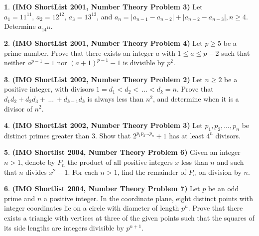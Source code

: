 \documentclass{article}
\newcommand{\plus}{+}
\newcommand{\minus}{-}
\newcommand{\equal}{=}
\theoremstyle{definition}
\newtheorem{p}{}
\begin{document}
\begin{p}{\bf (IMO ShortList 2001, Number Theory Problem 3)}
Let $ a_1 \equal{} 11^{11}, \, a_2 \equal{} 12^{12}, \, a_3 \equal{} 13^{13}$, and $ a_n \equal{} |a_{n \minus{} 1} \minus{} a_{n \minus{} 2}| \plus{} |a_{n \minus{} 2} \minus{} a_{n \minus{} 3}|, n \geq 4.$ Determine $ a_{14^{14}}$.
\end{p}



\begin{p}{\bf (IMO ShortList 2001, Number Theory Problem 4)}
Let $p \geq 5$ be a prime number. Prove that there exists an integer $a$ with $1 \leq a \leq p-2$ such that neither $a^{p-1}-1$ nor $(a+1)^{p-1}-1$ is divisible by $p^2$.
\end{p}



\begin{p}{\bf (IMO ShortList 2002, Number Theory Problem 2)}
Let $n\geq2$ be a positive integer, with divisors $1=d_1<d_2<\,\ldots<d_k=n$.  Prove that $d_1d_2+d_2d_3+\,\ldots\,+d_{k-1}d_k$ is always less than $n^2$, and determine when it is a divisor of $n^2$.
\end{p}




\begin{p}{\bf (IMO ShortList 2002, Number Theory Problem 3)}
Let $p_1,p_2,\ldots,p_n$ be distinct primes greater than 3. Show that $2^{p_1p_2\ldots p_n}+1$ has at least $4^n$ divisors.
\end{p}





\begin{p}{\bf (IMO Shortlist 2004, Number Theory Problem 6)}
Given an integer ${n>1}$, denote by $P_{n}$ the product of all positive integers $x$ less than $n$ and such that $n$ divides ${x^2-1}$. For each ${n>1}$, find the remainder of $P_{n}$ on division by $n$.
\end{p}




\begin{p}{\bf (IMO Shortlist 2004, Number Theory Problem 7)}
Let $p$ be an odd prime and $n$ a positive integer. In the coordinate plane, eight distinct points with integer coordinates lie on a circle with diameter of length $p^{n}$. Prove that there exists a triangle with vertices at three of the given points such that the squares of its side lengths are integers divisible by $p^{n+1}$.
\end{p}
\end{document}

